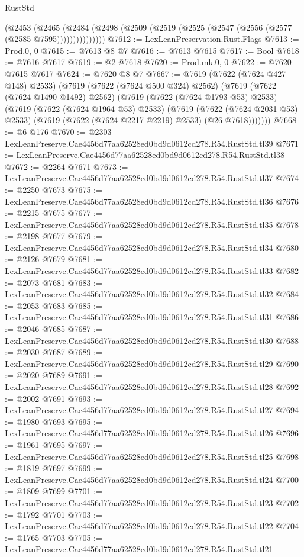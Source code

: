 \begin{lexlean}{RustStd}
\begin{coremodule}
            (@2453
              (@2465
                (@2484 (@2498 (@2509 (@2519 (@2525 (@2547 (@2556 (@2577 (@2585 @7595)))))))))))))))
@7612 := LexLeanPreservation.Rust.Flags
@7613 := Prod.{0, 0}
@7615 := @7613 @8 @7
@7616 := @7613 @7615
@7617 := Bool
@7618 := @7616 @7617
@7619 := @2 @7618
@7620 := Prod.mk.{0, 0}
@7622 := @7620 @7615 @7617
@7624 := @7620 @8 @7
@7667 := @7619
    (@7622 (@7624 @427 @148) @2533)
    (@7619
      (@7622 (@7624 @500 @324) @2562)
      (@7619
        (@7622 (@7624 @1490 @1492) @2562)
        (@7619
          (@7622 (@7624 @1793 @53) @2533)
          (@7619
            (@7622 (@7624 @1964 @53) @2533)
            (@7619
              (@7622 (@7624 @2031 @53) @2533)
              (@7619 (@7622 (@7624 @2217 @2219) @2533) (@26 @7618)))))))
@7668 := @6 @176
@7670 := @2303 LexLeanPreserve.Cae4456d77aa62528ed0bd9d0612cd278.R54.RustStd.tl39
@7671 := LexLeanPreserve.Cae4456d77aa62528ed0bd9d0612cd278.R54.RustStd.tl38
@7672 := @2264 @7671
@7673 := LexLeanPreserve.Cae4456d77aa62528ed0bd9d0612cd278.R54.RustStd.tl37
@7674 := @2250 @7673
@7675 := LexLeanPreserve.Cae4456d77aa62528ed0bd9d0612cd278.R54.RustStd.tl36
@7676 := @2215 @7675
@7677 := LexLeanPreserve.Cae4456d77aa62528ed0bd9d0612cd278.R54.RustStd.tl35
@7678 := @2198 @7677
@7679 := LexLeanPreserve.Cae4456d77aa62528ed0bd9d0612cd278.R54.RustStd.tl34
@7680 := @2126 @7679
@7681 := LexLeanPreserve.Cae4456d77aa62528ed0bd9d0612cd278.R54.RustStd.tl33
@7682 := @2073 @7681
@7683 := LexLeanPreserve.Cae4456d77aa62528ed0bd9d0612cd278.R54.RustStd.tl32
@7684 := @2053 @7683
@7685 := LexLeanPreserve.Cae4456d77aa62528ed0bd9d0612cd278.R54.RustStd.tl31
@7686 := @2046 @7685
@7687 := LexLeanPreserve.Cae4456d77aa62528ed0bd9d0612cd278.R54.RustStd.tl30
@7688 := @2030 @7687
@7689 := LexLeanPreserve.Cae4456d77aa62528ed0bd9d0612cd278.R54.RustStd.tl29
@7690 := @2020 @7689
@7691 := LexLeanPreserve.Cae4456d77aa62528ed0bd9d0612cd278.R54.RustStd.tl28
@7692 := @2002 @7691
@7693 := LexLeanPreserve.Cae4456d77aa62528ed0bd9d0612cd278.R54.RustStd.tl27
@7694 := @1980 @7693
@7695 := LexLeanPreserve.Cae4456d77aa62528ed0bd9d0612cd278.R54.RustStd.tl26
@7696 := @1961 @7695
@7697 := LexLeanPreserve.Cae4456d77aa62528ed0bd9d0612cd278.R54.RustStd.tl25
@7698 := @1819 @7697
@7699 := LexLeanPreserve.Cae4456d77aa62528ed0bd9d0612cd278.R54.RustStd.tl24
@7700 := @1809 @7699
@7701 := LexLeanPreserve.Cae4456d77aa62528ed0bd9d0612cd278.R54.RustStd.tl23
@7702 := @1792 @7701
@7703 := LexLeanPreserve.Cae4456d77aa62528ed0bd9d0612cd278.R54.RustStd.tl22
@7704 := @1765 @7703
@7705 := LexLeanPreserve.Cae4456d77aa62528ed0bd9d0612cd278.R54.RustStd.tl21

\end{coremodule}
\end{lexlean}
